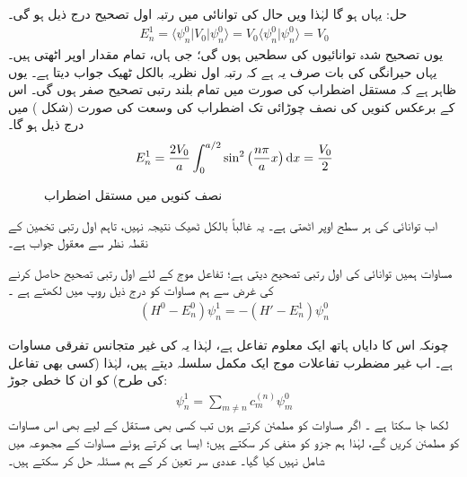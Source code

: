حل: یہاں    ہو گا لہٰذا    ویں حال کی توانائی میں رتبہ اول تصحیح درج ذیل ہو گی۔
\begin{align*}
E_n^1 = \langle \psi_n^0 | V_0 | \psi_n^0 \rangle = V_0 \langle \psi_n^0 | \psi_n^0 \rangle = V_0
\end{align*}
یوں  تصحیح  شدہ توانائیوں کی سطحیں   ہوں گی؛ جی ہاں،  تمام   مقدار  اوپر  اٹھتی ہیں۔ یہاں حیرانگی کی بات صرف  یہ ہے کہ رتبہ اول نظریہ بالکل ٹھیک جواب دیتا ہے۔ یوں ظاہر ہے کہ مستقل اضطراب کی صورت میں تمام بلند رتبی تصحیح صفر ہوں گی۔  اس کے برعکس کنویں کی نصف چوڑائی تک اضطراب کی وسعت کی صورت  (شکل )  میں درج ذیل   ہو گا۔
\begin{align*}
E_n^1 = \frac{2V_0}{a} \int_0^{a/2} \sin^2 \big(\frac{n \pi}{a} x\big ) \dif  x= \frac{V_0}{2}
\end{align*}
%
\begin{figure}
\centering
{}
\caption{نصف  کنویں میں مستقل اضطراب}
\label{شکل_غیر_تابع_اضطراب_نصف_چکور_مستقل_اضطراب}
\end{figure}


اب توانائی کی ہر سطح  اوپر  اٹھتی ہے۔ یہ غالباً بالکل ٹھیک نتیجہ نہیں،  تاہم  اول رتبی تخمین کے نقطہ نظر سے معقول جواب ہے۔

 مساوات    ہمیں توانائی کی اول رتبی  تصحیح دیتی ہے؛  تفاعل موج کے لئے اول رتبی تصحیح حاصل کرنے کی غرض سے ہم مساوات    کو درج ذیل روپ میں لکھتے ہے ۔
\begin{align}\label{مساوات_غیر_اضطراب_تصحیح_اول_توانائی}
(H^0 - E_n^0) \psi_n^1 = - (H' - E_n^1) \psi_n^0
\end{align}

چونکہ اس کا دایاں ہاتھ ایک معلوم تفاعل ہے،  لہٰذا یہ  کی  غیر  متجانس  تفرقی مساوات ہے۔  اب غیر مضطرب تفاعلات موج ایک مکمل سلسلہ دیتے ہیں،   لہٰذا   (کسی بھی تفاعل کی طرح)   کو ان کا خطی جوڑ:
\begin{align}\label{مساوات_غیر_اضطراب_تصحیح_اول_تفاعل}
\psi_n^1 = \sum_{m \ne n} c_m^{(n)} \psi_m^0
\end{align}
 لکھا جا سکتا ہے ۔ اگر  مساوات  کو مطمئن کرتے  ہوں تب کسی بھی مستقل  کے لیے  بھی اس مساوات کو مطمئن کریں  گے،   لہٰذا  ہم جزو  کو منفی کر سکتے ہیں؛ ایسا ہی کرتے ہوئے مساوات    کے مجموعہ میں  شامل نہیں کیا گیا۔ عددی سر  تعین کر کے ہم مسئلہ حل کر سکتے ہیں۔
 
